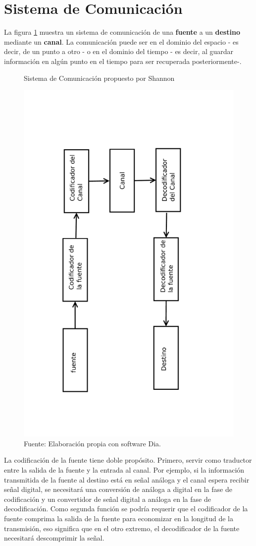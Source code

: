 \section{\quad Sistema de Comunicación}
La figura \ref{fig:sistemaComunicacion} muestra un sistema de comunicación de una \textbf{fuente} a un \textbf{destino} mediante un \textbf{canal}. La comunicación puede ser en el dominio del espacio - es decir, de un punto a otro - o en el dominio del tiempo - es decir, al guardar información en algún punto en el tiempo para ser recuperada posteriormente-.
\begin{figure}
\centering
\caption{Sistema de Comunicación propuesto por Shannon}
\includegraphics[angle=-90,width=0.7\linewidth]{sistema.pdf}
\caption*{Fuente: Elaboración propia con software Dia.}
\label{fig:sistemaComunicacion}
\end{figure}
La codificación de la fuente tiene doble propósito. Primero, servir como traductor entre la salida de la fuente y la entrada al canal. Por ejemplo, si la información transmitida de la fuente al destino está en señal análoga y el canal espera recibir señal digital, se necesitará una conversión de análoga a digital en la fase de codificación y un convertidor de señal digital a análoga en la fase de decodificación. Como segunda función se podría requerir que el codificador de la fuente comprima la salida de la fuente para economizar en la longitud de la transmisión, eso significa que en el otro extremo, el decodificador de la fuente necesitará descomprimir la señal.

